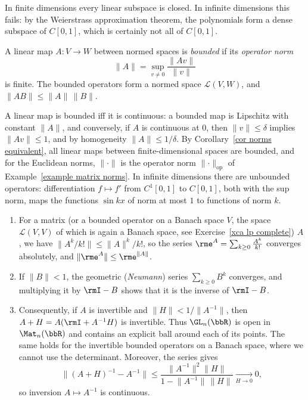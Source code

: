 In finite dimensions every linear subspace is closed. In infinite dimensions this fails: by the Weierstrass approximation theorem, the polynomials form a dense subspace of $C[0,1]$, which is certainly not all of $C[0,1]$.

\begin{defn}
    A linear map $A:V\to W$ between normed spaces is \emph{bounded} if its \emph{operator norm}
    \[\lVert A\rVert=\sup_{v\neq0}\frac{\lVert Av\rVert}{\lVert v\rVert}\]
    is finite. The bounded operators form a normed space $\mathcal{L}(V,W)$, and $\lVert AB\rVert\leq\lVert A\rVert\,\lVert B\rVert$.
\end{defn}

A linear map is bounded iff it is continuous: a bounded map is Lipschitz with constant $\lVert A\rVert$, and conversely, if $A$ is continuous at $0$, then $\lVert v\rVert\leq\delta$ implies $\lVert Av\rVert\leq1$, and by homogeneity $\lVert A\rVert\leq1/\delta$. By Corollary~\ref{cor norms equivalent}, all linear maps between finite-dimensional spaces are bounded, and for the Euclidean norms, $\lVert\cdot\rVert$ is the operator norm $\lVert\cdot\rVert_{\mathrm{op}}$ of Example~\ref{example matrix norms}. In infinite dimensions there are unbounded operators: differentiation $f\mapsto f'$ from $C^1[0,1]$ to $C[0,1]$, both with the sup norm, maps the functions $\sin kx$ of norm at most $1$ to functions of norm $k$.

\begin{example}\label{example Neumann series}
    \begin{enumerate}
        \item For a matrix (or a bounded operator on a Banach space $V$, the space $\mathcal{L}(V,V)$ of which is again a Banach space, see Exercise~\ref{xca lp complete}) $A$, we have $\lVert A^k/k!\rVert\leq\lVert A\rVert^k/k!$, so the series $\rme^A=\sum_{k\geq0}\frac{A^k}{k!}$ converges absolutely, and $\lVert\rme^A\rVert\leq\rme^{\lVert A\rVert}$.
        \item If $\lVert B\rVert<1$, the geometric (\emph{Neumann}) series $\sum_{k\geq0}B^k$ converges, and multiplying it by $\rmI-B$ shows that it is the inverse of $\rmI-B$.
        \item Consequently, if $A$ is invertible and $\lVert H\rVert<1/\lVert A^{-1}\rVert$, then $A+H=A(\rmI+A^{-1}H)$ is invertible. Thus $\GL_n(\bbR)$ is open in $\Mat_n(\bbR)$ and contains an explicit ball around each of its points. The same holds for the invertible bounded operators on a Banach space, where we cannot use the determinant. Moreover, the series gives
        \[\lVert(A+H)^{-1}-A^{-1}\rVert\leq\frac{\lVert A^{-1}\rVert^2\lVert H\rVert}{1-\lVert A^{-1}\rVert\,\lVert H\rVert}\xrightarrow[H\to0]{}0,\]
        so inversion $A\mapsto A^{-1}$ is continuous.
    \end{enumerate}
\end{example}

